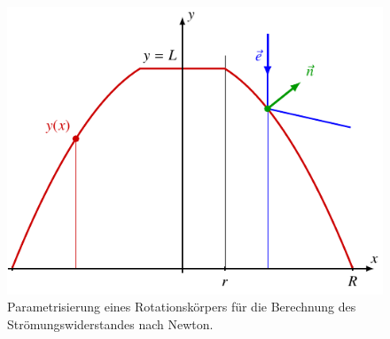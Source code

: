 %
%
%
\begin{figure}
\centering
\includegraphics{papers/widerstand/images/koerper.pdf}
\caption{Parametrisierung eines Rotationskörpers für die Berechnung
des Strömungswiderstandes nach Newton.
\label{widerstand:fig:koerper}}
\end{figure}
